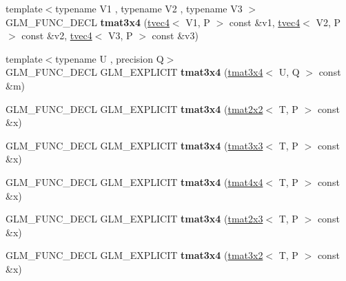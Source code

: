 \begin{DoxyCompactItemize}
\item 
\mbox{\label{structglm_1_1tmat3x4_a79898618d22d01dd865e88d61aaf9016}} 
{\footnotesize template$<$typename V1 , typename V2 , typename V3 $>$ }\\G\+L\+M\+\_\+\+F\+U\+N\+C\+\_\+\+D\+E\+CL {\bfseries tmat3x4} (\hyperlink{structglm_1_1tvec4}{tvec4}$<$ V1, P $>$ const \&v1, \hyperlink{structglm_1_1tvec4}{tvec4}$<$ V2, P $>$ const \&v2, \hyperlink{structglm_1_1tvec4}{tvec4}$<$ V3, P $>$ const \&v3)
\item 
\mbox{\label{structglm_1_1tmat3x4_a605d52801a88671ed149ac1580f913aa}} 
{\footnotesize template$<$typename U , precision Q$>$ }\\G\+L\+M\+\_\+\+F\+U\+N\+C\+\_\+\+D\+E\+CL G\+L\+M\+\_\+\+E\+X\+P\+L\+I\+C\+IT {\bfseries tmat3x4} (\hyperlink{structglm_1_1tmat3x4}{tmat3x4}$<$ U, Q $>$ const \&m)
\item 
\mbox{\label{structglm_1_1tmat3x4_a0ed0439eeabeb33a938b5c1fa0d863b9}} 
G\+L\+M\+\_\+\+F\+U\+N\+C\+\_\+\+D\+E\+CL G\+L\+M\+\_\+\+E\+X\+P\+L\+I\+C\+IT {\bfseries tmat3x4} (\hyperlink{structglm_1_1tmat2x2}{tmat2x2}$<$ T, P $>$ const \&x)
\item 
\mbox{\label{structglm_1_1tmat3x4_a03d2fae8e2bee08e4cff77f26f674be8}} 
G\+L\+M\+\_\+\+F\+U\+N\+C\+\_\+\+D\+E\+CL G\+L\+M\+\_\+\+E\+X\+P\+L\+I\+C\+IT {\bfseries tmat3x4} (\hyperlink{structglm_1_1tmat3x3}{tmat3x3}$<$ T, P $>$ const \&x)
\item 
\mbox{\label{structglm_1_1tmat3x4_af6107faa14e8655813db0fc464242ae9}} 
G\+L\+M\+\_\+\+F\+U\+N\+C\+\_\+\+D\+E\+CL G\+L\+M\+\_\+\+E\+X\+P\+L\+I\+C\+IT {\bfseries tmat3x4} (\hyperlink{structglm_1_1tmat4x4}{tmat4x4}$<$ T, P $>$ const \&x)
\item 
\mbox{\label{structglm_1_1tmat3x4_a15f3fac4d543da49854067add7993dc9}} 
G\+L\+M\+\_\+\+F\+U\+N\+C\+\_\+\+D\+E\+CL G\+L\+M\+\_\+\+E\+X\+P\+L\+I\+C\+IT {\bfseries tmat3x4} (\hyperlink{structglm_1_1tmat2x3}{tmat2x3}$<$ T, P $>$ const \&x)
\item 
\mbox{\label{structglm_1_1tmat3x4_ab235cb72196b66b354ca6db5b3de36ab}} 
G\+L\+M\+\_\+\+F\+U\+N\+C\+\_\+\+D\+E\+CL G\+L\+M\+\_\+\+E\+X\+P\+L\+I\+C\+IT {\bfseries tmat3x4} (\hyperlink{structglm_1_1tmat3x2}{tmat3x2}$<$ T, P $>$ const \&x)

\end{DoxyCompactItemize}
